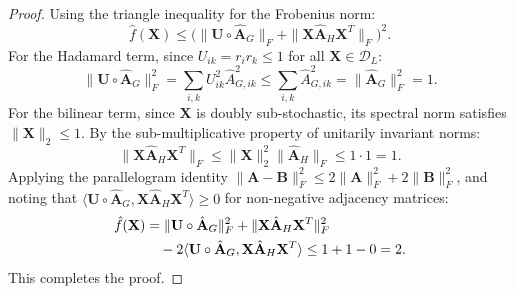 \documentclass[conference]{IEEEtran}
\begin{document}
\begin{proof}
Using the triangle inequality for the Frobenius norm:
\begin{equation}
\hat{f}(\mathbf{X}) \leq \Big( \|\mathbf{U} \circ \hat{\mathbf{A}}_G\|_F + \|\mathbf{X}\hat{\mathbf{A}}_H\mathbf{X}^T\|_F \Big)^2.
\end{equation}
For the Hadamard term, since $U_{ik} = r_i r_k \leq 1$ for all $\mathbf{X} \in \mathcal{D}_L$:
\begin{equation}
\|\mathbf{U} \circ \hat{\mathbf{A}}_G\|_F^2 = \sum_{i, k} U_{ik}^2 \hat{A}_{G, ik}^2 \leq \sum_{i, k} \hat{A}_{G, ik}^2 = \|\hat{\mathbf{A}}_G\|_F^2 = 1.
\end{equation}
For the bilinear term, since $\mathbf{X}$ is doubly sub-stochastic, its spectral norm satisfies $\|\mathbf{X}\|_2 \leq 1$. By the sub-multiplicative property of unitarily invariant norms:
\begin{equation}
\|\mathbf{X}\hat{\mathbf{A}}_H\mathbf{X}^T\|_F \leq \|\mathbf{X}\|_2^2 \|\hat{\mathbf{A}}_H\|_F \leq 1 \cdot 1 = 1.
\end{equation}
Applying the parallelogram identity $\|\mathbf{A} - \mathbf{B}\|_F^2 \leq 2\|\mathbf{A}\|_F^2 + 2\|\mathbf{B}\|_F^2$, and noting that $\langle\mathbf{U}\circ\hat{\mathbf{A}}_G, \mathbf{X}\hat{\mathbf{A}}_H\mathbf{X}^T\rangle \geq 0$ for non-negative adjacency matrices:
\begin{align}
\hat{f}(\mathbf{X}) &= \|\mathbf{U}\circ\hat{\mathbf{A}}_G\|_F^2 + \|\mathbf{X}\hat{\mathbf{A}}_H\mathbf{X}^T\|_F^2 \notag\\
&\quad - 2\langle\mathbf{U}\circ\hat{\mathbf{A}}_G, \mathbf{X}\hat{\mathbf{A}}_H\mathbf{X}^T\rangle \leq 1 + 1 - 0 = 2.
\end{align}
This completes the proof.
\end{proof}
\end{document}
